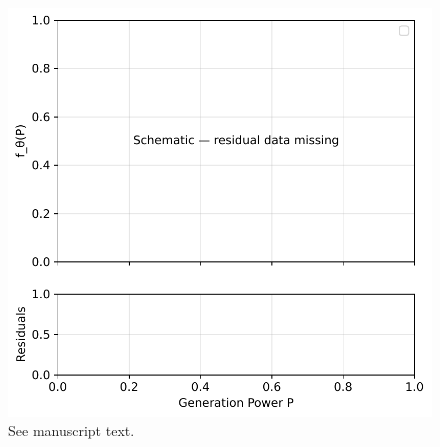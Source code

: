 \begin{figure}[t]
\centering
\includegraphics[width=0.9\linewidth]{paper/figures/fig9_symbolic_extraction_fit_improved.pdf}
\caption{See manuscript text.}
\end{figure}
